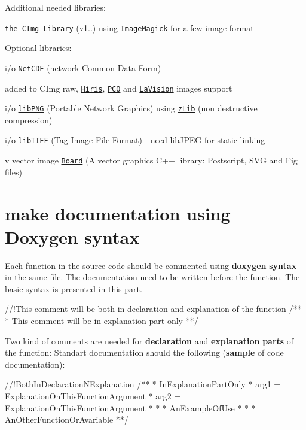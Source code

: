 \begin{DoxyParagraph}{Additional needed libraries\-:}

\end{DoxyParagraph}
\begin{DoxyItemize}
\item \href{http://cimg.sourceforge.net}{\tt the C\-Img Library} (v1..) using \href{http://www.imagemagick.org/}{\tt Image\-Magick} for a few image format\end{DoxyItemize}
\begin{DoxyParagraph}{Optional libraries\-:}

\end{DoxyParagraph}
\begin{DoxyItemize}
\item i/o \href{http://www.unidata.ucar.edu/software/netcdf/}{\tt Net\-C\-D\-F} (network Common Data Form) \item added to C\-Img raw, \href{http://www.rd-vision.com/}{\tt Hiris}, \href{http://www.pco.de/}{\tt P\-C\-O} and \href{http://www.lavision.de}{\tt La\-Vision} images support \item i/o \href{http://www.libpng.org/}{\tt lib\-P\-N\-G} (Portable Network Graphics) using \href{http://www.zlib.net/}{\tt z\-Lib} (non destructive compression) \item i/o \href{http://www.libtiff.org/}{\tt lib\-T\-I\-F\-F} (Tag Image File Format) -\/ need lib\-J\-P\-E\-G for static linking \item v vector image \href{http://libboard.sourceforge.net/}{\tt Board} (A vector graphics C++ library\-: Postscript, S\-V\-G and Fig files)\end{DoxyItemize}
\hypertarget{index_sectionDoxygenSyntax}{}\section{make documentation using Doxygen syntax}\label{index_sectionDoxygenSyntax}
Each function in the source code should be commented using {\bfseries doxygen} {\bfseries syntax} in the same file. The documentation need to be written before the function. The basic syntax is presented in this part. 
\begin{DoxyVerbInclude}
//!This comment will be both in declaration and explanation of the function
/**
 * This comment will be in explanation part only
**/
\end{DoxyVerbInclude}


Two kind of comments are needed for {\bfseries declaration} and {\bfseries explanation} {\bfseries parts} of the function\-: Standart documentation should the following ({\bfseries sample} of code documentation)\-: 
\begin{DoxyVerbInclude}
//!BothInDeclarationNExplanation
/** 
 * InExplanationPartOnly
 * \param arg1 = ExplanationOnThisFunctionArgument
 * \param arg2 = ExplanationOnThisFunctionArgument
 *
 * \code
 *   AnExampleOfUse
 * \endcode
 *
 * \see AnOtherFunctionOrAvariable
**/
\end{DoxyVerbInclude}


